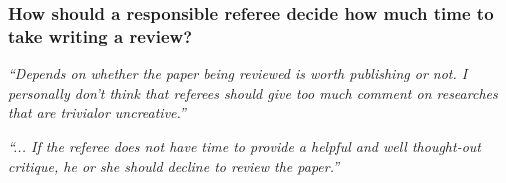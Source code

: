 \documentclass[12pt]{beamer}
\newcommand\ans[1]{{\it ``#1''}}
\newcommand\gap{\vspace{5mm}}
\begin{document}
\begin{frame}   %

  \frametitle{ How should a responsible referee decide how much time to take writing a review? }

  \ans{Depends on whether the paper being reviewed is worth publishing or not.  I personally don’t think that referees should give too much comment on researches that are trivialor uncreative.}

  \gap
  
  \ans{... If the referee does not have time to provide a helpful and well thought-out critique, he or she should decline to review the paper.}
  












\end{frame}
\end{document}
